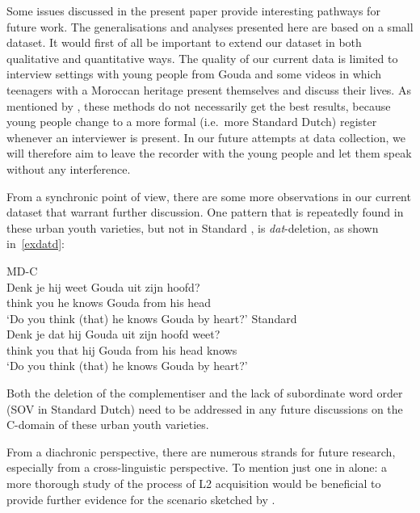 \documentclass[output=paper]{langsci/langscibook}
\begin{document}
\noindent Some issues discussed in the present paper provide interesting
pathways for future work. The generalisations and analyses presented here are
based on a small dataset. It would first of all be important to extend our
dataset in both qualitative and quantitative ways. The quality of our current
data is limited to interview settings with young people from Gouda and some
videos in which  teenagers with a Moroccan heritage present themselves and
discuss their lives. As mentioned by \citet{Freywaldetal:2015}, these methods
do not necessarily get the best results, because young people change to a more
formal (i.e.\ more Standard Dutch) register whenever an interviewer is present.
In our future attempts at data collection, we will therefore aim to leave the
recorder with the young people and let them speak without any interference.

From a synchronic point of view, there are some more observations in our
current dataset that warrant further discussion. One pattern that is repeatedly
found in these urban youth varieties, but not in Standard , is
\emph{dat}-deletion, as shown in~\eqref{exdatd}:\largerpage

\ea
    \ea\label{exdatd} MD-C\\
    \gll Denk je hij weet Gouda uit zijn hoofd?\\
    think you he knows Gouda from his head\\
    \trans \enquote*{Do you think (that) he knows Gouda by heart?}
    \ex Standard \\
    \gll Denk je dat hij Gouda uit zijn hoofd weet?\\
    think you that hij Gouda from his head knows\\
    \trans \enquote*{Do you think (that) he knows Gouda by heart?}
    \z
\z

\noindent Both the deletion of the complementiser and the lack of subordinate
word order (SOV in Standard Dutch) need to be addressed in any future
discussions on the C-domain of these urban youth varieties.

From a diachronic perspective, there are numerous strands for future research,
especially from a cross-linguistic perspective. To mention just one in 
alone: a more thorough study of the process of L2 acquisition would be
beneficial to provide further evidence for the scenario sketched by
\citet{Walkden:2017}.

\end{document}
